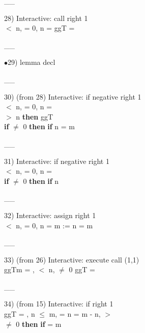 \documentclass[a4paper]{article}
\begin{document}
\vspace{-1.5ex}\_\hrulefill \_

28) Interactive: call right  1\\
 $<$ n,  = 0, n =  \Fol \Do ggT\Dc {} = 

\vspace{-1.5ex}\_\hrulefill \_

$\bullet$29) lemma decl \\
 \Fol 

\vspace{-1.5ex}\_\hrulefill \_

30)  (from 28) Interactive: if negative right  1\\
\tabf {} $<$ n,  = 0, n =  \\
\Fol {}  $>$ n {\bf then} ggT \\
 \tabf {} {\bf if}  $\neq$ 0 {\bf then} {\bf if} n %
{} = m

\vspace{-1.5ex}\_\hrulefill \_

31) Interactive: if negative right  1\\
\tabf {} $<$ n,  = 0, n =  \\
\Fol \Do 
{\bf if}  $\neq$ 0 {\bf then} 
{\bf if} n %

\vspace{-1.5ex}\_\hrulefill \_

32) Interactive: assign right  1\\
 $<$ n,  = 0, n =  \Fol \Do m := n\Dc {} = m

\vspace{-1.5ex}\_\hrulefill \_

33)  (from 26) Interactive: execute call  (1,1)\\
\Do ggT\Dc m = ,  $<$ n,  $\neq$ 0 \Fol \Do ggT\Dc {} = 

\vspace{-1.5ex}\_\hrulefill \_

34)  (from 15) Interactive: if right  1\\
\tabf \Do ggT\Dc {} = , n $\le$ m,  = n \And {} = m - n, \Not {} $>$  \\
\Fol {}  $\neq$ 0 {\bf then} {\bf if}  %
{} = m
\end{document}
